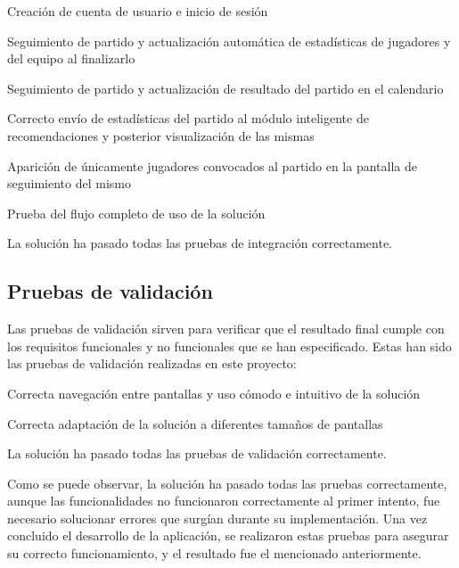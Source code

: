 \begin{description}[
    labelindent=2em,
    leftmargin=!,
    labelwidth=2.5cm,
    labelsep=1em,
    font=\normalfont
  ]
  \item[PI-01:] Creación de cuenta de usuario e inicio de sesión
  \item[PI-02:] Seguimiento de partido y actualización automática de estadísticas de jugadores y del equipo al finalizarlo
  \item[PI-03:] Seguimiento de partido y actualización de resultado del partido en el calendario
  \item[PI-04:] Correcto envío de estadísticas del partido al módulo inteligente de recomendaciones y posterior visualización de las mismas
  \item[PI-05:] Aparición de únicamente jugadores convocados al partido en la pantalla de seguimiento del mismo
  \item[PI-06:] Prueba del flujo completo de uso de la solución
  \item[\textbf{Resultado obtenido:}] La solución ha pasado todas las pruebas de integración correctamente.
\end{description}

\subsection{Pruebas de validación}

Las pruebas de validación sirven para verificar que el resultado final cumple con los requisitos funcionales y no funcionales que se han especificado. Estas han sido las pruebas de validación realizadas en este proyecto:

\begin{description}[
    labelindent=2em,
    leftmargin=!,
    labelwidth=2.5cm,
    labelsep=1em,
    font=\normalfont
  ]
  \item[PV-01:] Correcta navegación entre pantallas y uso cómodo e intuitivo de la solución
  \item[PV-02:] Correcta adaptación de la solución a diferentes tamaños de pantallas
  \item[\textbf{Resultado obtenido:}] La solución ha pasado todas las pruebas de validación correctamente.
\end{description}

Como se puede observar, la solución ha pasado todas las pruebas correctamente, aunque las funcionalidades no funcionaron correctamente al primer intento, fue necesario solucionar errores que surgían durante su implementación. Una vez concluido el desarrollo de la aplicación, se realizaron estas pruebas para asegurar su correcto funcionamiento, y el resultado fue el mencionado anteriormente.

